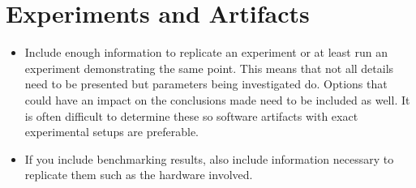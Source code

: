 \section{Experiments and Artifacts}

\begin{itemize}
  \item{} Include enough information to replicate an experiment or at least run an experiment
    demonstrating the same point. This means that not all details need to be presented but
    parameters being investigated do. Options that could have an impact on the conclusions made
    need to be included as well. It is often difficult to determine these so software artifacts
    with exact experimental setups are preferable.
  \item{} If you include benchmarking results, also include information necessary to replicate them
    such as the hardware involved.
\end{itemize}
